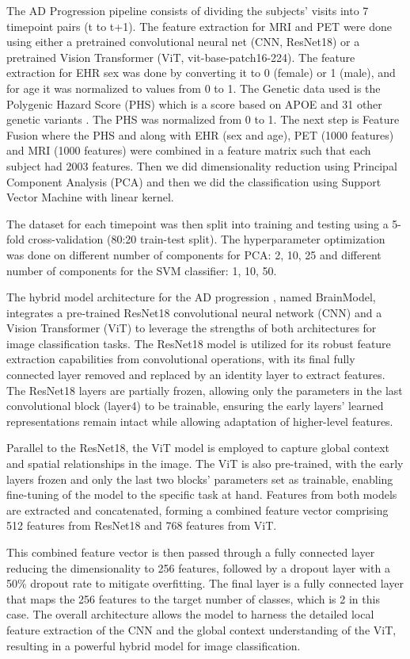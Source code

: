 The AD Progression pipeline consists of dividing the subjects’ visits into 7 timepoint pairs (t to t+1). The feature extraction for MRI and PET were done using either a pretrained convolutional neural net (CNN, ResNet18) or a pretrained Vision Transformer (ViT, vit-base-patch16-224). The feature extraction for EHR sex was done by converting it to 0 (female) or 1 (male), and for age it was normalized to values from 0 to 1. The Genetic data used is the Polygenic Hazard Score (PHS) which is a score based on APOE and 31 other genetic variants \cite{desikan_genetic_2017}. The PHS was normalized from 0 to 1. The next step is Feature Fusion where the PHS and along with EHR (sex and age), PET (1000 features) and MRI (1000 features) were combined in a feature matrix such that each subject had 2003 features. Then we did dimensionality reduction using Principal Component Analysis (PCA) and then we did the classification using Support Vector Machine with linear kernel.  

The dataset for each timepoint was then split into training and testing using a 5-fold cross-validation (80:20 train-test split). The hyperparameter optimization was done on different number of components for PCA: 2, 10, 25 and different number of components for the SVM classifier: 1, 10, 50. 

The hybrid model architecture for the AD progression , named BrainModel, integrates a pre-trained ResNet18 convolutional neural network (CNN) and a Vision Transformer (ViT) to leverage the strengths of both architectures for image classification tasks. The ResNet18 model is utilized for its robust feature extraction capabilities from convolutional operations, with its final fully connected layer removed and replaced by an identity layer to extract features. The ResNet18 layers are partially frozen, allowing only the parameters in the last convolutional block (layer4) to be trainable, ensuring the early layers' learned representations remain intact while allowing adaptation of higher-level features.

Parallel to the ResNet18, the ViT model is employed to capture global context and spatial relationships in the image. The ViT is also pre-trained, with the early layers frozen and only the last two blocks' parameters set as trainable, enabling fine-tuning of the model to the specific task at hand. Features from both models are extracted and concatenated, forming a combined feature vector comprising 512 features from ResNet18 and 768 features from ViT.

This combined feature vector is then passed through a fully connected layer reducing the dimensionality to 256 features, followed by a dropout layer with a 50\% dropout rate to mitigate overfitting. The final layer is a fully connected layer that maps the 256 features to the target number of classes, which is 2 in this case. The overall architecture allows the model to harness the detailed local feature extraction of the CNN and the global context understanding of the ViT, resulting in a powerful hybrid model for image classification.

